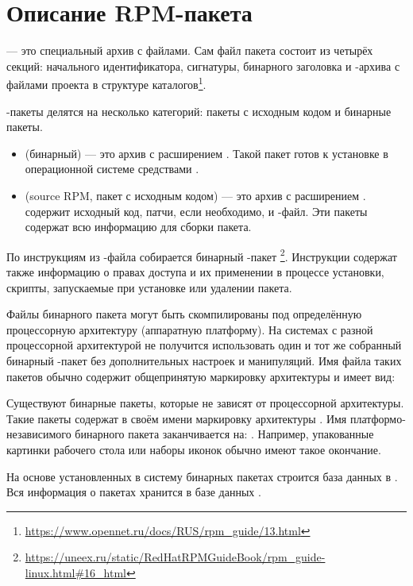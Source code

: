 \hypertarget{rpm-pack-desc}{\section{Описание RPM-пакета}}

 --- это специальный архив с файлами. Сам файл пакета состоит из четырёх секций:
начального идентификатора, сигнатуры, бинарного заголовка и -архива с файлами проекта в структуре
каталогов\footnote{\href{https://www.opennet.ru/docs/RUS/rpm_guide/13.html}{https://www.opennet.ru/docs/RUS/rpm\_guide/13.html}}.

-пакеты делятся на несколько категорий: пакеты с исходным кодом и бинарные пакеты.
\begin{itemize}
	\item {} (бинарный) --- это архив с расширением . Такой пакет готов к установке в
		операционной системе средствами .
	\item {} (source RPM, пакет с исходным кодом) --- это архив с расширением .
		 содержит исходный код, патчи, если необходимо, и -файл. Эти пакеты содержат
		всю информацию для сборки пакета.
\end{itemize}

По инструкциям из -файла собирается бинарный -пакет%
\footnote{\href{https://uneex.ru/static/RedHatRPMGuideBook/rpm_guide-linux.html\#16_html}{https://uneex.ru/static/RedHatRPMGuideBook/rpm\_guide-linux.html\#16\_html}}. Инструкции содержат также информацию о правах доступа и их применении в
процессе установки, скрипты, запускаемые при установке или удалении пакета.

Файлы бинарного пакета могут быть скомпилированы под определённую процессорную архитектуру (аппаратную платформу).
На системах с разной процессорной архитектурой не получится использовать один и тот же
собранный бинарный -пакет без дополнительных настроек и манипуляций.
Имя файла таких пакетов обычно содержит общепринятую маркировку архитектуры и имеет вид:

Существуют бинарные пакеты, которые не зависят от процессорной архитектуры. Такие пакеты содержат
в своём имени маркировку архитектуры . Имя платформо-независимого бинарного пакета
заканчивается на: . Например, упакованные картинки рабочего стола или наборы иконок
обычно имеют такое окончание.

На основе установленных в систему бинарных пакетах строится база данных в . Вся
информация о пакетах хранится в базе данных .

